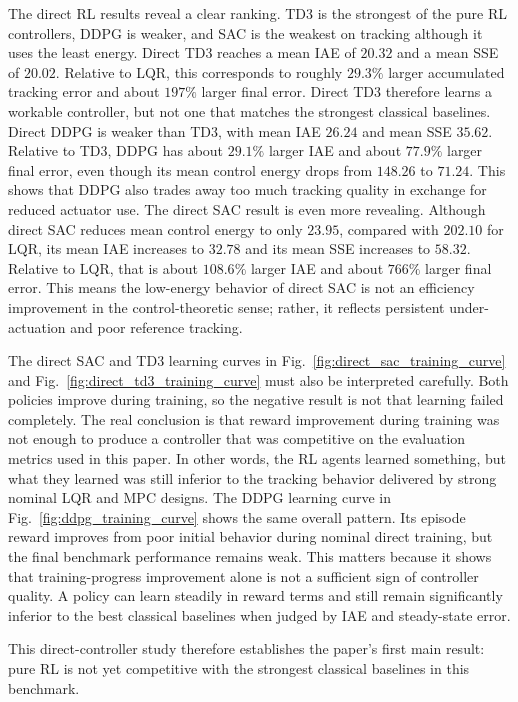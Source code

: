 \documentclass[conference]{IEEEtran}
\begin{document}
The direct RL results reveal a clear ranking. TD3 is the strongest of the pure RL controllers, DDPG is weaker, and SAC is the weakest on tracking although it uses the least energy. Direct TD3 reaches a mean IAE of $20.32$ and a mean SSE of $20.02$. Relative to LQR, this corresponds to roughly $29.3\%$ larger accumulated tracking error and about $197\%$ larger final error. Direct TD3 therefore learns a workable controller, but not one that matches the strongest classical baselines. Direct DDPG is weaker than TD3, with mean IAE $26.24$ and mean SSE $35.62$. Relative to TD3, DDPG has about $29.1\%$ larger IAE and about $77.9\%$ larger final error, even though its mean control energy drops from $148.26$ to $71.24$. This shows that DDPG also trades away too much tracking quality in exchange for reduced actuator use. The direct SAC result is even more revealing. Although direct SAC reduces mean control energy to only $23.95$, compared with $202.10$ for LQR, its mean IAE increases to $32.78$ and its mean SSE increases to $58.32$. Relative to LQR, that is about $108.6\%$ larger IAE and about $766\%$ larger final error. This means the low-energy behavior of direct SAC is not an efficiency improvement in the control-theoretic sense; rather, it reflects persistent under-actuation and poor reference tracking.

The direct SAC and TD3 learning curves in Fig.~\ref{fig:direct_sac_training_curve} and Fig.~\ref{fig:direct_td3_training_curve} must also be interpreted carefully. Both policies improve during training, so the negative result is not that learning failed completely. The real conclusion is that reward improvement during training was not enough to produce a controller that was competitive on the evaluation metrics used in this paper. In other words, the RL agents learned something, but what they learned was still inferior to the tracking behavior delivered by strong nominal LQR and MPC designs. The DDPG learning curve in Fig.~\ref{fig:ddpg_training_curve} shows the same overall pattern. Its episode reward improves from poor initial behavior during nominal direct training, but the final benchmark performance remains weak. This matters because it shows that training-progress improvement alone is not a sufficient sign of controller quality. A policy can learn steadily in reward terms and still remain significantly inferior to the best classical baselines when judged by IAE and steady-state error.

This direct-controller study therefore establishes the paper's first main result: pure RL is not yet competitive with the strongest classical baselines in this benchmark.
\end{document}
